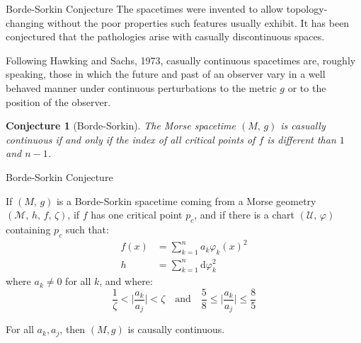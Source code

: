 \documentclass{beamer}
\newtheorem{conjecture}{Conjecture}
\begin{document}
    \begin{frame}{Borde-Sorkin Conjecture}
        The spacetimes were invented to allow topology-changing
        without the poor properties such features usually exhibit. It has been
        conjectured that the pathologies arise with casually discontinuous
        spaces.
        \par\hfill\par
        Following Hawking and Sachs, 1973, casually continuous spacetimes are,
        roughly speaking, those in which the future and past of an observer
        vary in a well behaved manner under continuous perturbations to the
        metric $g$ or to the position of the observer.
        \par\hfill\par
        \begin{conjecture}[Borde-Sorkin]
            The Morse spacetime $(M,\,g)$ is casually continuous if and only
            if the index of all critical points of $f$ is different than
            $1$ and $n-1$.
        \end{conjecture}
    \end{frame}
    \begin{frame}{Borde-Sorkin Conjecture}
        \begin{theorem}
            If $(M,\,g)$ is a Borde-Sorkin spacetime coming from a Morse
            geometry $(\mathcal{M},\,h,\,f,\,\zeta)$, if $f$ has one critical
            point $p_{c}$, and if there is a chart $(\mathcal{U},\,\varphi)$
            containing $p_{c}$ such that:
            \begin{align}
                f(x)&=\sum_{k=1}^{n}a_{k}\varphi_{k}(x)^{2}\\
                h&=\sum_{k=1}^{n}\textrm{d}\varphi_{k}^{2}
            \end{align}
            where $a_{k}\ne{0}$ for all $k$, and where:
            \begin{equation}
                \frac{1}{\zeta}<\Big|\frac{a_{k}}{a_{j}}\Big|<\zeta\quad\textrm{and}\quad
                \frac{5}{8}\leq\Big|\frac{a_{k}}{a_{j}}\Big|\leq\frac{8}{5}
            \end{equation}
        \end{theorem}
        For all $a_{k},a_{j}$, then $(M,g)$ is causally continuous.
    \end{frame}
\end{document}
